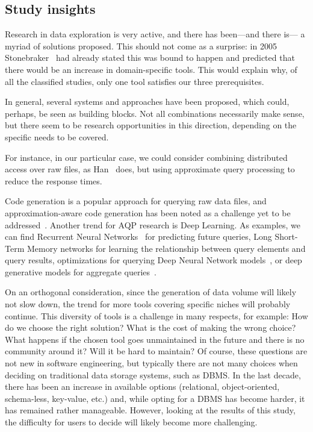 \subsection{Study insights}
\label{sec:mapping/insights}
Research in data exploration is very active, and there has been---and there is---
a myriad of solutions proposed. This should not come as a surprise:
in 2005 Stonebraker~\cite{Stonebraker2005} had already stated this was bound to
happen and predicted that there would be an increase in domain-specific tools.
This would explain why, of all the classified studies, only one tool satisfies our
three prerequisites.

In general, several systems and approaches have been proposed, which could,
perhaps, be seen as building blocks. Not all combinations necessarily make sense,
but there seem to be research opportunities in this direction, depending
on the specific needs to be covered.

For instance, in our particular case, we could consider combining distributed
access over raw files, as Han~\cite{Han2017} does, but using approximate query
processing to reduce the response times.

Code generation is a popular approach for querying raw data files, and \linebreak
approximation-aware code generation has been noted as a challenge
yet to be addressed~\cite{Mozafari2017AQP}. Another trend
for \gls{AQP} research is Deep Learning. As examples, we can find
Recurrent Neural Networks~\cite{shahrivari_workload_2022,meduri_evaluation_2021}
for predicting future queries, Long Short-Term Memory networks for learning the
relationship between query elements and query results, optimizations for
querying Deep Neural Network models~\cite{kang_accelerating_2021},
or deep generative models for aggregate queries~\cite{thirumuruganathan_approximate_2020}.

On an orthogonal consideration, since the generation of data volume will likely
not slow down, the trend for more tools covering specific
niches will probably continue. This diversity of tools is a
challenge in many respects, for example: How do we choose the right solution? What is
the cost of making the wrong choice? What happens if the chosen tool goes
unmaintained in the future and there is no community around it? Will it
be hard to maintain? Of course, these questions are not new in software
engineering, but typically there are not many choices when deciding
on traditional data storage systems, such as \gls{DBMS}.
In the last decade, there has been an increase in available options
(relational, object-oriented, schema-less, key-value, etc.) and, while opting
for a \gls{DBMS} has become harder, it has remained rather manageable. However, looking at the
results of this study, the difficulty for users to decide will likely become
more challenging.

